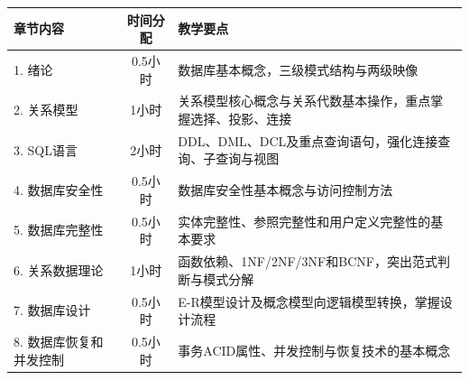 \documentclass{../note}
\begin{document}
\begin{tabular}{|l|c|p{8cm}|}
	\hline
	\textbf{章节内容} & \textbf{时间分配} & \textbf{教学要点} \\
	\hline
	1. 绪论         & 0.5小时         &
	数据库基本概念，三级模式结构与两级映像                           \\
	\hline
	2. 关系模型       & 1小时           &
	关系模型核心概念与关系代数基本操作，重点掌握选择、投影、连接                 \\
	\hline
	3. SQL语言      & 2小时           &
	DDL、DML、DCL及重点查询语句，强化连接查询、子查询与视图                     \\
	\hline
	4. 数据库安全性     & 0.5小时         &
	数据库安全性基本概念与访问控制方法                           \\
	\hline
	5. 数据库完整性     & 0.5小时         &
	实体完整性、参照完整性和用户定义完整性的基本要求                         \\
	\hline
	6. 关系数据理论     & 1小时           &
	函数依赖、1NF/2NF/3NF和BCNF，突出范式判断与模式分解                     \\
	\hline
	7. 数据库设计      & 0.5小时         &
	E-R模型设计及概念模型向逻辑模型转换，掌握设计流程                       \\
	\hline
	8. 数据库恢复和并发控制 & 0.5小时         &
	事务ACID属性、并发控制与恢复技术的基本概念                         \\
	\hline
\end{tabular}
\end{document}
